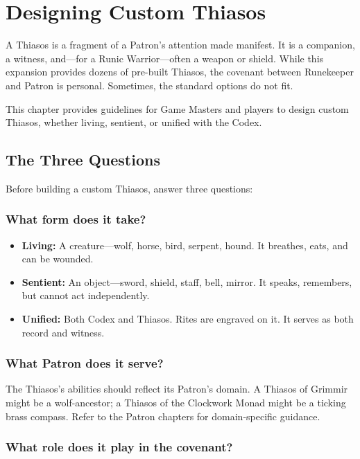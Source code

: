 \section{Designing Custom Thiasos}

A Thiasos is a fragment of a Patron's attention made manifest. It is a companion, a witness, and—for a Runic Warrior—often a weapon or shield. While this expansion provides dozens of pre-built Thiasos, the covenant between Runekeeper and Patron is personal. Sometimes, the standard options do not fit.

This chapter provides guidelines for Game Masters and players to design custom Thiasos, whether living, sentient, or unified with the Codex.

\subsection{The Three Questions}

Before building a custom Thiasos, answer three questions:

\subsubsection{What form does it take?}

\begin{itemize}
\item \textbf{Living:} A creature—wolf, horse, bird, serpent, hound. It breathes, eats, and can be wounded.
\item \textbf{Sentient:} An object—sword, shield, staff, bell, mirror. It speaks, remembers, but cannot act independently.
\item \textbf{Unified:} Both Codex and Thiasos. Rites are engraved on it. It serves as both record and witness.
\end{itemize}

\subsubsection{What Patron does it serve?}

The Thiasos's abilities should reflect its Patron's domain. A Thiasos of Grimmir might be a wolf-ancestor; a Thiasos of the Clockwork Monad might be a ticking brass compass. Refer to the Patron chapters for domain-specific guidance.

\subsubsection{What role does it play in the covenant?}

